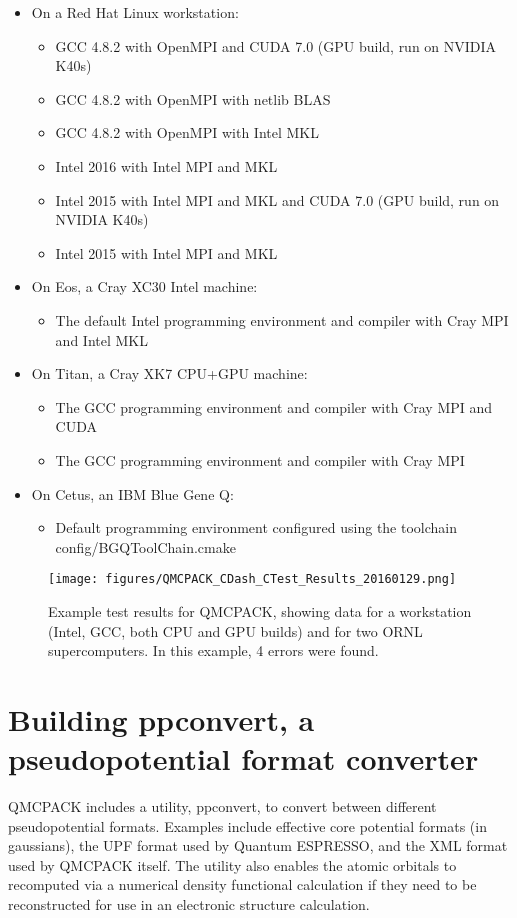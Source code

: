 \begin{itemize}
\item On a Red Hat Linux workstation:
  \begin{itemize}
  \item GCC 4.8.2 with OpenMPI and CUDA 7.0 (GPU build, run on NVIDIA K40s) 
  \item GCC 4.8.2 with OpenMPI with netlib BLAS
  \item GCC 4.8.2 with OpenMPI with Intel MKL
  \item Intel 2016 with Intel MPI and MKL
  \item Intel 2015 with Intel MPI and MKL and CUDA 7.0 (GPU build, run on NVIDIA K40s) 
  \item Intel 2015 with Intel MPI  and MKL
  \end{itemize}
\item On Eos, a Cray XC30 Intel machine:
  \begin{itemize}
\item The default Intel programming environment and compiler with Cray MPI and Intel MKL
  \end{itemize}

\item On Titan, a Cray XK7 CPU+GPU machine:
  \begin{itemize}
  \item The GCC programming environment and compiler with Cray MPI and CUDA 
  \item The GCC programming environment and compiler with Cray MPI 
  \end{itemize}
\item On Cetus, an IBM Blue Gene Q:
\begin{itemize}
\item Default programming environment configured using the  toolchain config/BGQToolChain.cmake
\end{itemize}
\end{itemize}

\begin{figure}
  \centering
  \texttt{[image: figures/QMCPACK\_CDash\_CTest\_Results\_20160129.png]}
  \caption{Example test results for QMCPACK, showing data for a
    workstation (Intel, GCC, both CPU and GPU builds) and for two ORNL
    supercomputers. In this example, 4 errors were found.}
  \label{fig:cdash}
\end{figure}

\section{Building ppconvert, a pseudopotential format converter}
\label{sec:buildppconvert}
QMCPACK includes a utility, ppconvert, to convert between different
pseudopotential formats. Examples include effective core potential
formats (in gaussians), the UPF format used by Quantum ESPRESSO, and
the XML format used by QMCPACK itself. The utility also enables the
atomic orbitals to recomputed via a numerical density functional
calculation if they need to be reconstructed for use in an
electronic structure calculation.

